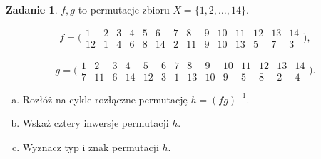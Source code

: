 \documentclass[11pt]{article}
\theoremstyle{definition}
\newtheorem{zadanie}{Zadanie}
\numberwithin{zadanie}{subsection}
\begin{document}
\begin{zadanie}
    $f, g$ to permutacje zbioru $X=\{1,2,\dots,14\}$.

    $$f = \big(\begin{smallmatrix}
                1&2&3&4&5&6&7&8&9&10&11&12&13&14\\
                12&1&4&6&8&14&2&11&9&10&13&5&7&3
            \end{smallmatrix}\big),$$

    $$g = \big(\begin{smallmatrix}
                1&2&3&4&5&6&7&8&9&10&11&12&13&14\\
                7&11&6&14&12&3&1&13&10&9&5&8&2&4
            \end{smallmatrix}\big).$$

    \begin{enumerate}[a)]
        \item Rozłóż na cykle rozłączne permutację $h=(fg)^{-1}.$
        \item Wskaż cztery inwersje permutacji $h$.
        \item Wyznacz typ i znak permutacji $h$.
    \end{enumerate}
\end{zadanie}
\end{document}
